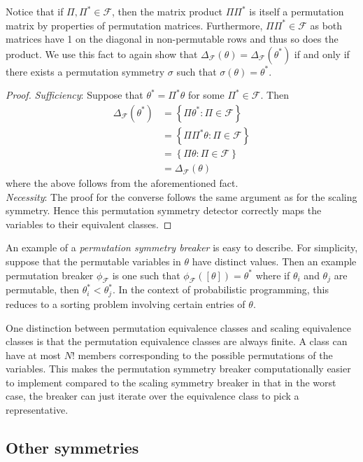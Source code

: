Notice that if $\Pi,\Pi^*\in\mathcal{F}$, then the matrix product $\Pi\Pi^*$ is itself a permutation matrix by properties of permutation matrices. Furthermore, $\Pi\Pi^*\in\mathcal{F}$ as both matrices have 1 on the diagonal in non-permutable rows and thus so does the product. We use this fact to again show that $\Delta_\mathcal{F}(\theta)=\Delta_\mathcal{F}(\theta^*)$ if and only if there exists a permutation symmetry $\sigma$ such that $\sigma(\theta)=\theta^*$.

\begin{proof}
\textit{Sufficiency}: Suppose that $\theta^*=\Pi^*\theta$ for some $\Pi^*\in\mathcal{F}$. Then
\begin{align*}
\Delta_\mathcal{F}(\theta^*) &= \left\{\Pi\theta^*:\Pi\in\mathcal{F}\right\} \\
&= \left\{\Pi\Pi^*\theta:\Pi\in\mathcal{F}\right\} \\
&= \left\{\Pi\theta:\Pi\in\mathcal{F}\right\} \\
&= \Delta_\mathcal{F}(\theta)
\end{align*}
where the above follows from the aforementioned fact.
\\

\noindent \textit{Necessity}: The proof for the converse follows the same argument as for the scaling symmetry. Hence this permutation symmetry detector correctly maps the variables to their equivalent classes.
\end{proof}

An example of a \textit{permutation symmetry breaker} is easy to describe. For simplicity, suppose that the permutable variables in $\theta$ have distinct values. Then an example permutation breaker $\phi_\mathcal{F}$ is one such that $\phi_\mathcal{F}([\theta])=\theta^*$ where if $\theta_i$ and $\theta_j$ are permutable, then $\theta^*_i<\theta^*_j$. In the context of probabilistic programming, this reduces to a sorting problem involving certain entries of $\theta$.

One distinction between permutation equivalence classes and scaling equivalence classes is that the permutation equivalence classes are always finite. A class can have at most $N!$ members corresponding to the possible permutations of the variables. This makes the permutation symmetry breaker computationally easier to implement compared to the scaling symmetry breaker in that in the worst case, the breaker can just iterate over the equivalence class to pick a representative.


\subsection{Other symmetries}


